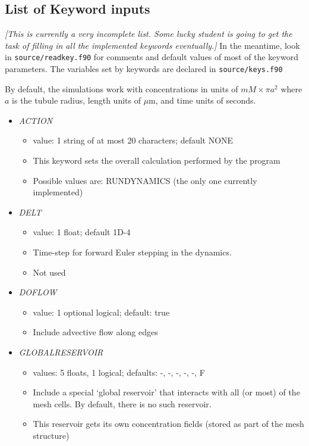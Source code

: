 \documentclass[12pt]{article}
\newcommand{\comment}[1]{{\color{red} \it [#1]}}
\begin{document}
\subsection*{List of Keyword inputs}

\comment{This is currently a very incomplete list. Some lucky student is going to get the task of filling in all the implemented keywords eventually.} In the meantime, look in \verb=source/readkey.f90= for comments and default values of most of the keyword parameters. The variables set by keywords are declared in \verb=source/keys.f90=

By default, the simulations work with concentrations in units of $mM \times \pi a^2$ where $a$ is the tubule radius, length units of $\mu$m, and time units of seconds.

\begin{itemize}
%
\item {\it ACTION}
  \begin{itemize}
    \item  value: 1 string of at most 20 characters; default NONE
    \item This keyword sets the overall calculation performed by the program 
    \item Possible values are: RUNDYNAMICS (the only one currently implemented)
  \end{itemize}
%
\item {\it DELT}
    \begin{itemize}
      \item  value: 1 float; default 1D-4
      \item Time-step for forward Euler stepping in the dynamics. 
      \item Not used
    \end{itemize}
%
\item {\it DOFLOW}
\begin{itemize}
	\item  value: 1 optional logical; default: true 
	\item Include advective flow along edges
\end{itemize}
%
\item {\it GLOBALRESERVOIR}
\begin{itemize}
	\item values: 5 floats, 1 logical; defaults: -, -, -, -, -, F
	\item Include a special `global reservoir' that interacts with all (or most) of the mesh cells. By default, there is no such reservoir.
	\item This reservoir gets its own concentration fields (stored as part of the mesh structure)

\end{itemize}
\end{itemize}
\end{document}
